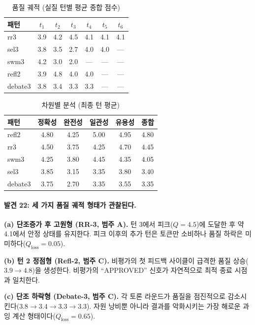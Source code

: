 \documentclass[a4paper,11pt]{article}
\begin{document}
\begin{table}[H]
\centering
\caption{품질 궤적 (실질 턴별 평균 종합 점수)}
\label{tab:quality-trajectory}
{\small
\begin{tabular}{lcccccc}
\toprule
패턴 & $t_1$ & $t_2$ & $t_3$ & $t_4$ & $t_5$ & $t_6$ \\
\midrule
rr3     & 3.9 & 4.2 & 4.5 & 4.1 & 4.1 & 4.1 \\
sel3    & 3.8 & 3.5 & 2.7 & 4.0 & 4.0 & --- \\
swm3    & 4.2 & 3.0 & 2.0 & --- & --- & --- \\
refl2   & 3.9 & 4.8 & 4.0 & 4.0 & --- & --- \\
debate3 & 3.8 & 3.4 & 3.3 & 3.3 & --- & --- \\
\bottomrule
\end{tabular}
}
\end{table}

\begin{table}[H]
\centering
\caption{차원별 분석 (최종 턴 평균)}
\label{tab:dimension-analysis}
{\small
\begin{tabular}{lccccc}
\toprule
패턴 & 정확성 & 완전성 & 일관성 & 유용성 & 종합 \\
\midrule
refl2   & 4.80 & 4.25 & 5.00 & 4.95 & 4.80 \\
rr3     & 4.50 & 3.75 & 4.25 & 4.70 & 4.45 \\
swm3    & 4.25 & 3.80 & 4.45 & 4.35 & 4.05 \\
sel3    & 3.85 & 3.15 & 3.35 & 3.80 & 3.40 \\
debate3 & 3.75 & 2.70 & 3.35 & 3.55 & 3.35 \\
\bottomrule
\end{tabular}
}
\end{table}

\paragraph{발견 22: 세 가지 품질 궤적 형태가 관찰된다.}

\textbf{(a) 단조증가 후 고원형 (RR-3, 범주 A).} 턴 3에서 피크($Q=4.5$)에 도달한 후 약 4.1에서 안정 상태를 유지한다. 피크 이후의 추가 턴은 토큰만 소비하나 품질 하락은 미미하다($Q_{\text{loss}}=0.05$).

\textbf{(b) 턴 2 정점형 (Refl-2, 범주 C).} 비평가의 첫 피드백 사이클이 급격한 품질 상승($3.9 \to 4.8$)을 생성한다. 비평가의 ``APPROVED'' 신호가 자연적으로 최적 종료 시점과 일치한다.

\textbf{(c) 단조 하락형 (Debate-3, 범주 C).} 각 토론 라운드가 품질을 점진적으로 감소시킨다($3.8 \to 3.4 \to 3.3 \to 3.3$). 자원 낭비뿐 아니라 결과를 악화시키는 가장 해로운 과잉 계산 형태이다($Q_{\text{loss}}=0.65$).
\end{document}

